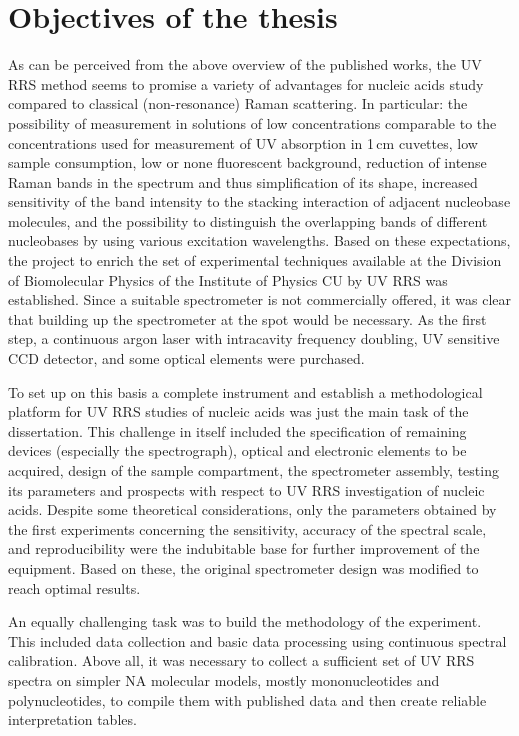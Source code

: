 \chapter{Objectives of the thesis}
\label{objectives}

As can be perceived from the above overview of the published works, the UV RRS
method seems to promise a variety of advantages for nucleic acids study
compared to classical (non-resonance) Raman scattering.
In particular: the possibility of measurement in solutions of low
concentrations comparable to the concentrations used for measurement of
UV absorption in 1\,cm cuvettes, low sample consumption, low or none
fluorescent background, reduction of intense Raman bands in the spectrum and
thus simplification of its shape, increased sensitivity of the band intensity
to the stacking interaction of adjacent nucleobase molecules, and the
possibility to distinguish the overlapping bands of different nucleobases by
using various excitation wavelengths.
Based on these expectations, the project to enrich the set of experimental
techniques available at the Division of Biomolecular Physics of the Institute
of Physics CU by UV RRS was established.
Since a suitable spectrometer is not commercially offered, it was clear that
building up the spectrometer at the spot would be necessary.
As the first step, a continuous argon laser with intracavity frequency
doubling, UV sensitive CCD detector, and some optical elements were purchased.

To set up on this basis a complete instrument and establish a methodological
platform for UV RRS studies of nucleic acids was just the main task of the
dissertation.
This challenge in itself included the specification of remaining devices
(especially the spectrograph), optical and electronic elements to be acquired,
design of the sample compartment, the spectrometer assembly, testing its
parameters and prospects with respect to UV RRS investigation of nucleic acids.
Despite some theoretical considerations, only the parameters obtained by the
first experiments concerning the sensitivity, accuracy of the spectral scale,
and reproducibility were the indubitable base for further improvement of the
equipment.
Based on these, the original spectrometer design was modified to reach optimal
results.

An equally challenging task was to build the methodology of the experiment.
This included data collection and basic data processing using continuous
spectral calibration.
Above all, it was necessary to collect a sufficient set of UV RRS spectra on
simpler NA molecular models, mostly mononucleotides and polynucleotides, to
compile them with published data and then create reliable interpretation
tables.


